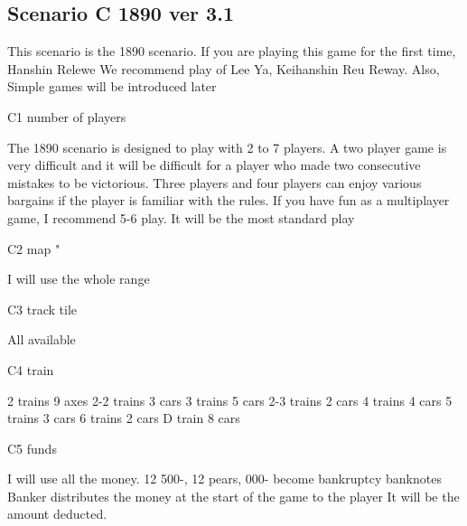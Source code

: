 \documentclass{article}
\begin{document}
\begin{CJK}{UTF8}{min}








\section{Scenario C 1890 ver 3.1}

This scenario is the 1890 scenario.
If you are playing this game for the first time, Hanshin Relewe
We recommend play of Lee Ya, Keihanshin Reu Reway. Also,
Simple games will be introduced later

C1 number of players

The 1890 scenario is designed to play with 2 to 7 players. A two player game is very difficult and it will be difficult for a player who made two consecutive mistakes to be victorious. Three players and four players can enjoy various bargains if the player is familiar with the rules. If you have fun as a multiplayer game, I recommend 5-6 play. It will be the most standard play

C2 map "

I will use the whole range

C3 track tile

All available

C4 train

2 trains 9 axes
2-2 trains 3 cars
3 trains 5 cars
2-3 trains 2 cars
4 trains 4 cars
5 trains 3 cars
6 trains 2 cars
D train 8 cars

C5 funds

I will use all the money. 12 500-, 12 pears, 000- become bankruptcy banknotes Banker distributes the money at the start of the game to the player It will be the amount deducted.


\end{CJK}
\end{document}
